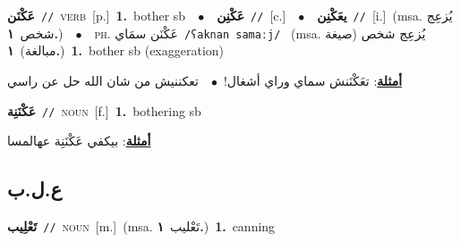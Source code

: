\documentclass[10pt,a4paper,twoside]{article} %
\begin{document}
\begin{multicols}{2}
{\setlength\topsep{0pt}\textbf{\foreignlanguage{arabic}{عَكْنَن}}\ {\color{gray}\texttt{//}\color{black}}\ \textsc{verb}\ [p.]\ \textbf{1.}~bother sb\ \ $\bullet$\ \ \setlength\topsep{0pt}\textbf{\foreignlanguage{arabic}{عَكْنِن}}\ {\color{gray}\texttt{//}\color{black}}\ [c.]\ \ $\bullet$\ \ \setlength\topsep{0pt}\textbf{\foreignlanguage{arabic}{يعَكْنِن}}\ {\color{gray}\texttt{//}\color{black}}\ [i.]\ \color{gray}(msa. \foreignlanguage{arabic}{يُزعِج شخص}~\foreignlanguage{arabic}{\textbf{١.}})\color{black}\ \ $\bullet$\ \ \textsc{ph.} \color{gray} \foreignlanguage{arabic}{عَكْنَن سمَاي}\color{black}\ {\color{gray}\texttt{/{\sffamily ʕaknan samaːj}/}\color{black}}\ \color{gray} (msa. \foreignlanguage{arabic}{يُزعِج شخص (صيغة مبالغة)}~\foreignlanguage{arabic}{\textbf{١.}})\color{black}\ \textbf{1.}~bother sb (exaggeration)\  \begin{flushright}\color{gray}\foreignlanguage{arabic}{\textbf{\underline{\foreignlanguage{arabic}{أمثلة}}}: تعَكْنَنش سماي وراي أشغال!\ $\bullet$\ \  تعكننيش من شان الله حل عن راسي}\end{flushright}\color{black}} \vspace{2mm}

{\setlength\topsep{0pt}\textbf{\foreignlanguage{arabic}{عَكْنَنِة}}\ {\color{gray}\texttt{//}\color{black}}\ \textsc{noun}\ [f.]\ \textbf{1.}~bothering sb\  \begin{flushright}\color{gray}\foreignlanguage{arabic}{\textbf{\underline{\foreignlanguage{arabic}{أمثلة}}}: بيكفي عَكْنَنِة عهالمسا}\end{flushright}\color{black}} \vspace{2mm}

\vspace{-3mm}
\subsection*{\color{blue}\foreignlanguage{arabic}{ع.ل.ب}\color{blue}{}} 

{\setlength\topsep{0pt}\textbf{\foreignlanguage{arabic}{تَعْلِيب}}\ {\color{gray}\texttt{//}\color{black}}\ \textsc{noun}\ [m.]\ \color{gray}(msa. \foreignlanguage{arabic}{تَعْليب}~\foreignlanguage{arabic}{\textbf{١.}})\color{black}\ \textbf{1.}~canning\ } \vspace{2mm}


\end{multicols}
\end{document}
